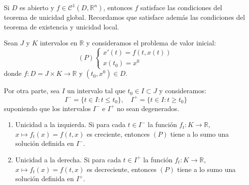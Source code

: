 \begin{remark}
    Si $D$ es abierto y $f \in \mathcal{C}^1(D, \mathbb{R}^n)$, entonces $f$ satisface las condiciones del teorema de unicidad global.
    Recordamos que satisface además las condiciones del teorema de existencia y unicidad local.
\end{remark}

\begin{proposition}
    Sean $J$ y $K$ intervalos en $\mathbb{R}$ y consideramos el problema de valor inicial:
    $$(P) \begin{cases}
            x'(t) = f(t, x(t)) \\
            x(t_0) = x^0
        \end{cases}$$
    donde $f: D = J \times K \to \mathbb{R}$ y $(t_0, x^0) \in D$.

    Por otra parte, sea $I$ un intervalo tal que $t_0 \in I \subset J$ y consideramos:
    $$I^- = \{t \in I: t \leq t_0\}, \quad I^+ = \{t \in I: t \geq t_0\}$$
    suponiendo que los intervalos $I^-$ e $I^+$ no sean degenerados.
    \begin{enumerate}
        \item Unicidad a la izquierda. Si para cada $t \in I^-$ la función $f_t: K \to \mathbb{R}$, $x \mapsto f_t(x) = f(t, x)$ es creciente, entonces $(P)$ tiene a lo sumo una solución definida en $I^-$.
        \item Unicidad a la derecha. Si para cada $t \in I^+$ la función $f_t: K \to \mathbb{R}$, $x \mapsto f_t(x) = f(t, x)$ es decreciente, entonces $(P)$ tiene a lo sumo una solución definida en $I^+$.
    \end{enumerate}
\end{proposition}

